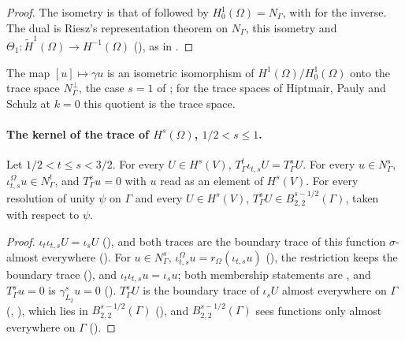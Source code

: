 \begin{proof}
\leanok
The isometry is that of  followed by
$H^1_0(\Omega) = N_\Gamma$, with  for the inverse. The
dual is Riesz's representation theorem on $N_\Gamma$, this isometry and
$\Theta_1 \colon \tilde H^1(\Omega) \to H^{-1}(\Omega)$ (), as
in .
\end{proof}

The map $[u] \mapsto \gamma u$ is an isometric isomorphism of $H^1(\Omega) / H^1_0(\Omega)$
onto the trace space $N_\Gamma^\perp$, the case $s = 1$ of
; for the trace spaces of Hiptmair, Pauly and Schulz
\cite{HiptmairPaulySchulz} at $k = 0$ this quotient is the trace space.

\paragraph{The kernel of the trace of $H^s(\Omega)$, $1/2 < s \leq 1$.}

\begin{lemma}
\label{lem:ambient-trace-inclusion}
\leanok
{}
Let $1/2 < t \leq s < 3/2$. For every $U \in H^s(V)$, $T^t_\Gamma \iota_{t,s} U = T^s_\Gamma U$.
For every $u \in N^s_\Gamma$, $\iota^\Omega_{t,s} u \in N^t_\Gamma$, and $T^s_\Gamma u = 0$ with
$u$ read as an element of $H^s(V)$. For every resolution of unity $\psi$ on $\Gamma$ and every
$U \in H^s(V)$, $T^s_\Gamma U \in B^{s-1/2}_{2,2}(\Gamma)$, taken with respect to $\psi$.
\end{lemma}

\begin{proof}
\leanok
$\iota_t \iota_{t,s} U = \iota_s U$ (), and both traces are the boundary
trace of this function $\sigma$-almost everywhere (). For
$u \in N^s_\Gamma$, $\iota^\Omega_{t,s} u = r_\Omega(\iota_{t,s} u)$
(), the restriction keeps the boundary trace
(), and $\iota_t \iota_{t,s} u = \iota_s u$; both
membership statements are , and $T^s_\Gamma u = 0$ is
$\gamma^s_{L_2} u = 0$ (). $T^s_\Gamma U$ is the boundary trace of $\iota_s U$
almost everywhere on $\Gamma$ (, ),
which lies in $B^{s-1/2}_{2,2}(\Gamma)$ (), and
$B^{s-1/2}_{2,2}(\Gamma)$ sees functions only almost everywhere on $\Gamma$
().
\end{proof}

